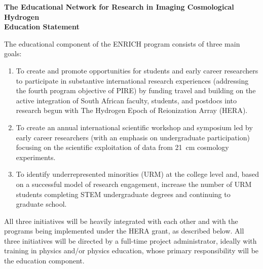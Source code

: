 \documentclass[preprint,11pt]{aastex}
\begin{document}
\clearpage
\setcounter{page}{1}

\setlength{\parindent}{0cm}
\textbf{\large The Educational Network for Research in Imaging Cosmological Hydrogen}\\
\textbf{Education Statement}
\vspace{6pt}
\setlength{\parindent}{17pt}

The educational component of the ENRICH program consists of three main goals:

\begin{enumerate}
\item To create and promote opportunities for students and early career researchers to participate in substantive international research experiences (addressing the fourth program objective of PIRE) by funding travel and building on the active integration of South African faculty, students, and postdocs into research begun with The Hydrogen Epoch of Reionization Array (HERA).

\item To create an annual international scientific workshop and symposium led by early career researchers (with an emphasis on undergraduate participation) focusing on the scientific exploitation of data from 21\, cm cosmology experiments.

\item To identify underrepresented minorities (URM) at the college level and, based on a successful model of research engagement, increase the number of URM students completing STEM undergraduate degrees and continuing to graduate school.
\end{enumerate}

All three initiatives will be heavily integrated with each other and with the programs being implemented under the HERA grant, as described below.  
All three initiatives will be directed by a full-time project administrator, ideally with training in physics and/or physics education, whose primary responsibility will be the education component.  
\end{document}
